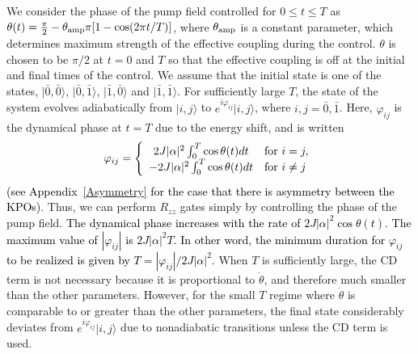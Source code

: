 \documentclass[%
 reprint,
 amsmath,amssymb,
 aps,
pra,
]{revtex4-2}
\begin{document}
We consider the phase of the pump field
controlled for $0 \le t \le T$ as $\theta(t) = \frac{\pi}{2} - \theta_{\rm amp} \pi [1-\cos(2\pi t/T)]$,
where $\theta_{\rm amp}$ is a constant parameter, which determines maximum strength of the effective coupling during the control.
$\theta$ is chosen to be $\pi/2$ at $t=0$ and $T$ so that the effective coupling is off at the initial and final times of the control. 
We assume that the initial state is one of the states, $|\bar{0},\bar{0}\rangle$, $|\bar{0},\bar{1}\rangle$, $|\bar{1},\bar{0}\rangle$ and $|\bar{1},\bar{1}\rangle$.
For sufficiently large $T$, the state of the system evolves adiabatically from $|i,j\rangle$ to $e^{i\varphi_{ij}}|i,j\rangle$, where $i,j=\bar{0},\bar{1}$.
Here, $\varphi_{ij}$ is the dynamical phase at $t=T$ due to the energy shift, and is written 
\begin{eqnarray}
\varphi_{ij} = \left\{
\begin{array}{cl}
2J|\alpha|^2\int_0^T  \cos\theta(t) dt &  {\rm for} \ i=j, \\
-2J|\alpha|^2\int_0^T \cos\theta(t) dt & {\rm for} \ i\ne j
\end{array}
\right.
\label{theta_1_6_22}
\end{eqnarray}
\textcolor{black}{(see Appendix~\ref{Asymmetry} for the case that there is asymmetry between the KPOs)}.
Thus, we can perform $R_{zz}$ gates simply by controlling the phase of the pump field.
\textcolor{black}{The dynamical phase increases with the rate of $2J|\alpha|^2\cos\theta(t)$.
The maximum value of $|\varphi_{ij}|$ is $2J|\alpha|^2T$.
In other word, the minimum duration for $\varphi_{ij}$ to be realized is given by $T=|\varphi_{ij}|/2J|\alpha|^2$.}
When $T$ is sufficiently large, the CD term is not necessary because it is
proportional to $\dot{\theta}$, and therefore 
 much smaller than the other parameters.
However, for the small $T$ regime where $\dot\theta$ is comparable to or greater than the other parameters, the final state considerably deviates from $e^{i\varphi_{ij}}|i,j\rangle$ due to nonadiabatic transitions unless the CD term is used.
\end{document}
